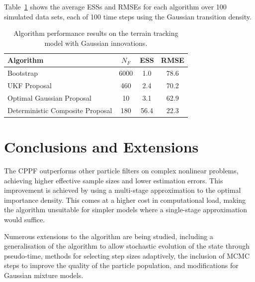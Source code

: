 \documentclass[conference]{IEEEtran}
\begin{document}
Table~\ref{tab:drone_results_gaussian} shows the average ESSs and RMSEs for each algorithm over 100 simulated data sets, each of 100 time steps using the Gaussian transition density.
%
\begin{table}
\renewcommand{\arraystretch}{1.3}
\centering
\caption{Algorithm performance results on the terrain tracking model with Gaussian innovations.}
\begin{tabular}{l||c|c|c}
Algorithm                                & $N_F$ & ESS  & RMSE \\
\hline
Bootstrap                                &  6000 &  1.0 & 78.6 \\
UKF Proposal                             &   460 &  2.4 & 70.2 \\
Optimal Gaussian Proposal                &    10 &  3.1 & 62.9 \\
Deterministic Composite Proposal         &   180 & 56.4 & 22.3 \\
\end{tabular}
\label{tab:drone_results_gaussian}
\end{table}



\section{Conclusions and Extensions}

The CPPF outperforms other particle filters on complex nonlinear problems, achieving higher effective sample sizes and lower estimation errors. This improvement is achieved by using a multi-stage approximation to the optimal importance density. This comes at a higher cost in computational load, making the algorithm unsuitable for simpler models where a single-stage approximation would suffice.

Numerous extensions to the algorithm are being studied, including a generalisation of the algorithm to allow stochastic evolution of the state through pseudo-time, methods for selecting step sizes adaptively, the inclusion of MCMC steps to improve the quality of the particle population, and modifications for Gaussian mixture models.
\end{document}
